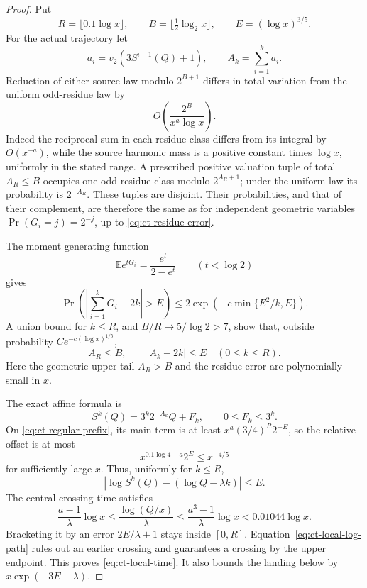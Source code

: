 \begin{proof}
Put
\[
 R=\lfloor0.1\log x\rfloor,\qquad
 B=\lfloor\tfrac12\log_2x\rfloor,\qquad
 E=(\log x)^{3/5}.
\]
For the actual trajectory let
\[
 a_i=v_2(3S^{i-1}(Q)+1),\qquad A_k=\sum_{i=1}^k a_i.
\]
Reduction of either source law modulo \(2^{B+1}\) differs in total
variation from the uniform odd-residue law by
\begin{equation}\label{eq:ct-residue-error}
 O\!\left(\frac{2^B}{x^a\log x}\right).
\end{equation}
Indeed the reciprocal sum in each residue class differs from its
integral by \(O(x^{-a})\), while the source harmonic mass is a
positive constant times \(\log x\), uniformly in the stated range.
A prescribed positive valuation tuple of total \(A_R\le B\)
occupies one odd residue class modulo \(2^{A_R+1}\); under the
uniform law its probability is \(2^{-A_R}\). These tuples are
disjoint. Their probabilities, and that of their complement, are
therefore the same as for independent geometric variables
\(\Pr(G_i=j)=2^{-j}\), up to \eqref{eq:ct-residue-error}.

The moment generating function
\[
 \mathbb E e^{tG_i}=\frac{e^t}{2-e^t}\qquad(t<\log2)
\]
gives
\[
 \Pr\left(\left|\sum_{i=1}^kG_i-2k\right|>E\right)
 \le2\exp\!\left(-c\min\{E^2/k,E\}\right).
\]
A union bound for \(k\le R\), and \(B/R\to5/\log2>7\), show
that, outside probability \(Ce^{-c(\log x)^{1/5}}\),
\begin{equation}\label{eq:ct-regular-prefix}
 A_R\le B,\qquad |A_k-2k|\le E\quad(0\le k\le R).
\end{equation}
Here the geometric upper tail \(A_R>B\) and the residue error are
polynomially small in \(x\).

The exact affine formula is
\[
 S^k(Q)=3^k2^{-A_k}Q+F_k,\qquad 0\le F_k\le3^k.
\]
On \eqref{eq:ct-regular-prefix}, its main term is at least
\(x^a(3/4)^R2^{-E}\), so the relative offset is at most
\[
 x^{0.1\log4-a}2^E\le x^{-4/5}
\]
for sufficiently large \(x\). Thus, uniformly for \(k\le R\),
\begin{equation}\label{eq:ct-local-log-path}
 \left|\log S^k(Q)-(\log Q-\lambda k)\right|\le E.
\end{equation}
The central crossing time satisfies
\[
 \frac{a-1}{\lambda}\log x
 \le \frac{\log(Q/x)}{\lambda}
 \le\frac{a^3-1}{\lambda}\log x
 <0.01044\log x.
\]
Bracketing it by an error \(2E/\lambda+1\) stays inside
\([0,R]\). Equation~\eqref{eq:ct-local-log-path} rules out an
earlier crossing and guarantees a crossing by the upper endpoint.
This proves \eqref{eq:ct-local-time}. It also bounds the landing
below by \(x\exp(-3E-\lambda)\).


\end{proof}
